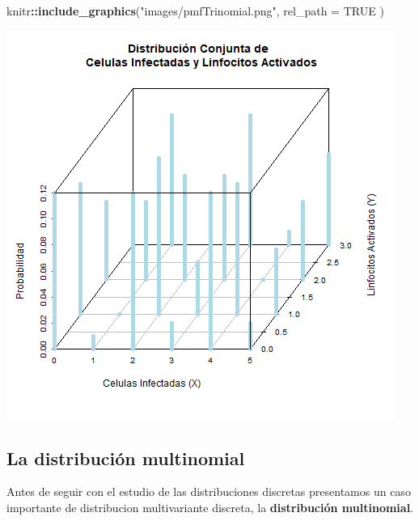 \documentclass[
]{article}
\newenvironment{Shaded}{\begin{snugshade}}{\end{snugshade}}
\newcommand{\AttributeTok}[1]{\textcolor[rgb]{0.13,0.29,0.53}{#1}}
\newcommand{\CommentTok}[1]{\textcolor[rgb]{0.56,0.35,0.01}{\textit{#1}}}
\newcommand{\ConstantTok}[1]{\textcolor[rgb]{0.56,0.35,0.01}{#1}}
\newcommand{\FunctionTok}[1]{\textcolor[rgb]{0.13,0.29,0.53}{\textbf{#1}}}
\newcommand{\NormalTok}[1]{#1}
\newcommand{\SpecialCharTok}[1]{\textcolor[rgb]{0.81,0.36,0.00}{\textbf{#1}}}
\newcommand{\StringTok}[1]{\textcolor[rgb]{0.31,0.60,0.02}{#1}}
\begin{document}
\begin{Shaded}
\end{Shaded}

\begin{Shaded}
\begin{Highlighting}[]
\NormalTok{knitr}\SpecialCharTok{::}\FunctionTok{include\_graphics}\NormalTok{(}\StringTok{"images/pmfTrinomial.png"}\NormalTok{, }\AttributeTok{rel\_path =} \ConstantTok{TRUE}\NormalTok{ )}
\end{Highlighting}
\end{Shaded}

\includegraphics[width=0.9\linewidth]{images/pmfTrinomial}

\subsection{La distribución multinomial}\label{la-distribuciuxf3n-multinomial}

Antes de seguir con el estudio de las distribuciones discretas presentamos un caso importante de distribucion multivariante discreta, la \textbf{distribución multinomial}.
\end{document}
